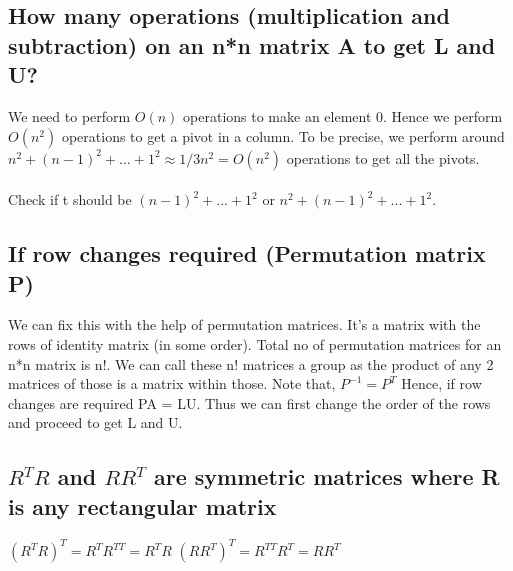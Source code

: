 \documentclass{article}
\begin{document}
\begin{enumerate}
\subsection{How many operations (multiplication and subtraction) on an n*n matrix A to get L and U?}

We need to perform $O(n)$ operations to make an element 0. Hence we perform $O(n^2)$ operations to get a pivot in a column. To be precise, we perform around $n^2 + (n-1)^2 + ... + 1^2 \approx 1/3n^2 = O(n^2)$ operations to get all the pivots.
\\~\\
Check if t should be $(n-1)^2 + ... + 1^2$ or $n^2 + (n-1)^2 + ... + 1^2$.


\subsection{If row changes required (Permutation matrix P)}
We can fix this with the help of permutation matrices. It's a matrix with the rows of identity matrix (in some order). Total no of permutation matrices for an n*n matrix is n!. We can call these n! matrices a group as the product of any 2 matrices of those is a matrix within those.  
Note that, $P^{-1} = P^T$
Hence, if row changes are required PA = LU. Thus we can first change the order of the rows and proceed to get L and U. 

\subsection{$R^TR$ and $RR^T$ are symmetric matrices where R is any rectangular matrix}
$(R^TR)^T = R^TR^{TT} = R^TR$ \newline
$(RR^T)^T = R^{TT}R^T = RR^T$


    
\end{enumerate}
\end{document}
